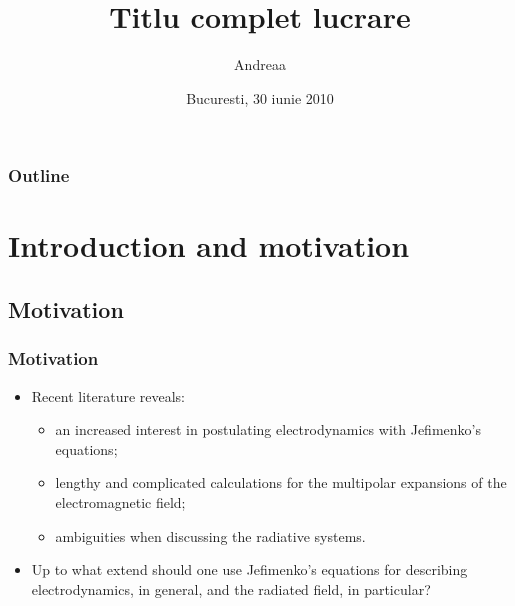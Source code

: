 \documentclass[a4,compress]{beamer}
\title[Titlu scurt lucrare]{Titlu complet lucrare}
\author{Andreaa}
\institute{Universitatea din Bucuresti}
\date{\small  Bucuresti, 30 iunie 2010}
\begin{document}




\begin{frame}
\frametitle{}
 \titlepage
\end{frame}





\begin{frame}[plain]
  \frametitle{Outline}
  \small
  \tableofcontents[hideallsubsections]
\end{frame}







\section[Introduction]{Introduction  and motivation}
\subsection{Motivation}
\begin{frame}
  \frametitle{Motivation}
  
 
\begin{itemize}
\item Recent literature reveals:
\begin{itemize}
	\item an increased interest in postulating electrodynamics with {\color{violet} Jefimenko's equations};
	\item lengthy and complicated calculations for the {\color{blue} multipolar expansions} of the electromagnetic field;
	\item ambiguities when discussing the {\color{red} radiative systems}.
\end{itemize}
\pause %

\item Up to what extend should one use {\color{violet} Jefimenko's equations} for describing electrodynamics, in general, and the {\color{red} radiated field}, in particular?
\end{itemize}

\end{frame}
\end{document}
